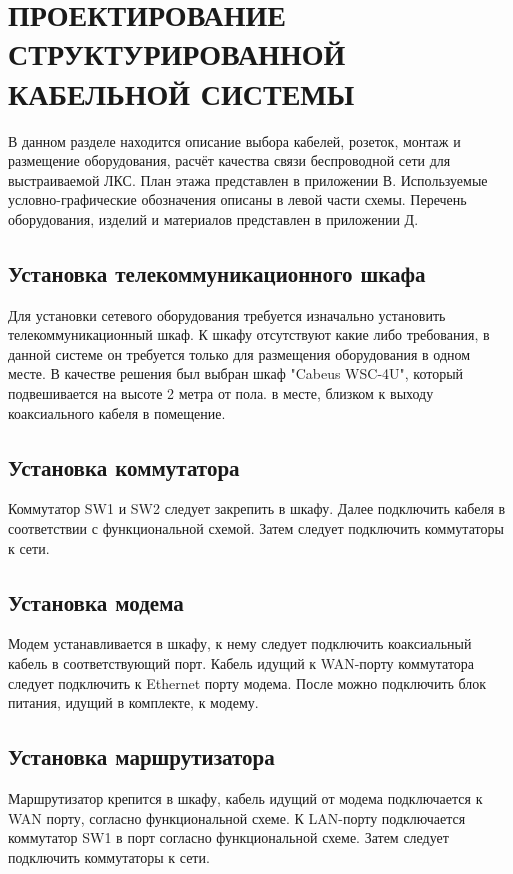 \section{ПРОЕКТИРОВАНИЕ СТРУКТУРИРОВАННОЙ КАБЕЛЬНОЙ СИСТЕМЫ}
\label{sec:dev}

В данном разделе находится описание выбора кабелей, розеток, монтаж и размещение оборудования,
расчёт качества связи беспроводной сети для выстраиваемой ЛКС. План этажа представлен в приложении В. 
Используемые условно-графические обозначения описаны в левой части схемы.
Перечень оборудования, изделий и материалов представлен в приложении Д. 

\subsection{Установка телекоммуникационного шкафа}

Для установки сетевого оборудования требуется изначально установить телекоммуникационный шкаф. 
К шкафу отсутствуют какие либо требования, в данной системе он требуется только для 
размещения оборудования в одном месте. В качестве решения был выбран шкаф "Cabeus WSC-4U",
который подвешивается на высоте 2 метра от пола. 
в месте, близком к выходу коаксиального кабеля в помещение.

\subsection{Установка коммутатора}

Коммутатор SW1 и SW2 следует закрепить в шкафу. Далее подключить кабеля в соответствии с функциональной схемой.
Затем следует подключить коммутаторы к сети.

\subsection{Установка модема}

Модем устанавливается в шкафу, к нему следует подключить коаксиальный кабель в соответствующий порт.
Кабель идущий к WAN-порту коммутатора следует подключить к Ethernet порту модема. 
После можно подключить блок питания, идущий в комплекте, к модему.

\subsection{Установка маршрутизатора}

Маршрутизатор крепится в шкафу, кабель идущий от модема подключается к WAN порту, согласно функциональной схеме.
К LAN-порту подключается коммутатор SW1 в порт согласно функциональной схеме. Затем следует подключить коммутаторы к сети.

